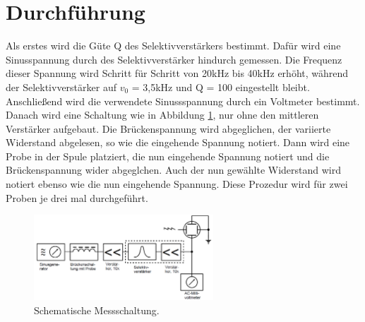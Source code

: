 \section{Durchführung}
\label{sec:Durchführung}
Als erstes wird die Güte Q des Selektivverstärkers bestimmt. Dafür wird eine Sinusspannung durch des Selektivverstärker hindurch gemessen. 
Die Frequenz dieser Spannung wird Schritt für Schritt von 20kHz bis 40kHz erhöht, während der Selektivverstärker auf $v_0$ = 3,5kHz und Q = 100 
eingestellt bleibt.
Anschließend wird die verwendete Sinussspannung durch ein Voltmeter bestimmt.
Danach wird eine Schaltung wie in Abbildung \ref{fig:3}, nur ohne den mittleren Verstärker aufgebaut.
Die Brückenspannung wird abgeglichen, der variierte Widerstand abgelesen, so wie die eingehende Spannung notiert.
Dann wird eine Probe in der Spule platziert, die nun eingehende Spannung notiert und die Brückenspannung wider abgeglchen. 
Auch der nun gewählte Widerstand wird notiert ebenso wie die nun eingehende Spannung.
Diese Prozedur wird für zwei Proben je drei mal durchgeführt.

\begin{figure}
    \centering
    \includegraphics[width = 0.60\textwidth]{V606Bild3.png}
    \caption{Schematische Messschaltung.}
    \label{fig:3}
\end{figure}

